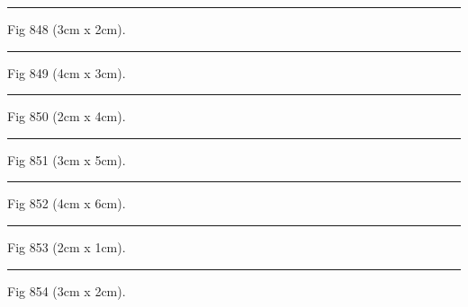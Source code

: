 \documentclass[a4paper,11pt]{article}
\begin{document}
\begin{swarmwrap}%
  \begin{minipage}[t]{3cm}
    \centering
    \rule{\linewidth}{2cm}
    {\footnotesize Fig 848 (3cm x 2cm).}
  \end{minipage}%
\end{swarmwrap}%
\swarmwrapnext
\lipsum[98]%

\begin{swarmwrap}%
  \begin{minipage}[t]{4cm}
    \centering
    \rule{\linewidth}{3cm}
    {\footnotesize Fig 849 (4cm x 3cm).}
  \end{minipage}%
\end{swarmwrap}%
\swarmwrapnext
\lipsum[99]%

\begin{swarmwrap}%
  \begin{minipage}[t]{2cm}
    \centering
    \rule{\linewidth}{4cm}
    {\footnotesize Fig 850 (2cm x 4cm).}
  \end{minipage}%
\end{swarmwrap}%
\swarmwrapnext
\lipsum[100]%

\begin{swarmwrap}%
  \begin{minipage}[t]{3cm}
    \centering
    \rule{\linewidth}{5cm}
    {\footnotesize Fig 851 (3cm x 5cm).}
  \end{minipage}%
\end{swarmwrap}%
\swarmwrapnext
\lipsum[101]%

\begin{swarmwrap}%
  \begin{minipage}[t]{4cm}
    \centering
    \rule{\linewidth}{6cm}
    {\footnotesize Fig 852 (4cm x 6cm).}
  \end{minipage}%
\end{swarmwrap}%
\swarmwrapnext
\lipsum[102]%

\begin{swarmwrap}%
  \begin{minipage}[t]{2cm}
    \centering
    \rule{\linewidth}{1cm}
    {\footnotesize Fig 853 (2cm x 1cm).}
  \end{minipage}%
\end{swarmwrap}%
\swarmwrapnext
\lipsum[103]%

\begin{swarmwrap}%
  \begin{minipage}[t]{3cm}
    \centering
    \rule{\linewidth}{2cm}
    {\footnotesize Fig 854 (3cm x 2cm).}
  \end{minipage}%
\end{swarmwrap}%
\swarmwrapnext
\lipsum[104]%
\end{document}
